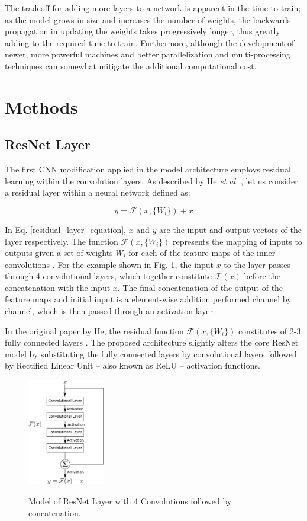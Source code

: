 \documentclass[conference]{IEEEtran}
\begin{document}
The tradeoff for adding more layers to a network is apparent in the time to train; as the model grows in size and increases the number of weights, the backwards propagation in updating the weights takes progressively longer, thus greatly adding to the required time to train. Furthermore, although the development of newer, more powerful machines and better parallelization and multi-processing techniques can somewhat mitigate the additional computational cost.
\section{Methods}
\subsection{ResNet Layer}
The first CNN modification applied in the model architecture employs residual learning within the convolution layers. As described by He \textit{et al.} \cite{He2016}, let us consider a residual layer within a neural network defined as:

\begin{equation}
y = \mathcal{F} \left(x,\{W_i\}\right) + x
\label{residual_layer_equation}
\end{equation}

In Eq. \ref{residual_layer_equation}, $x$ and $y$ are the input and output vectors of the layer respectively. The function $\mathcal{F} \left(x,\{W_i\}\right)$ represents the mapping of inputs to outputs given a set of weights $W_i$ for each of the feature maps of the inner convolutions \cite{He2016}. For the example shown in Fig. \ref{ResNet_Layer_Model}, the input $x$ to the layer passes through 4 convolutional layers, which together constitute $\mathcal{F}(x)$ before the concatenation with the input $x$. The final concatenation of the output of the feature maps and initial input is a element-wise addition performed channel by channel, which is then passed through an activation layer. 

In the original paper by He, the residual function $\mathcal{F} \left(x,\{W_i\}\right)$ constitutes of 2-3 fully connected layers \cite{He2016}. The proposed architecture slightly alters the core ResNet model by substituting the fully connected layers by convolutional layers followed by Rectified Linear Unit -- also known as ReLU -- activation functions.

\begin{figure}
\centering
\includegraphics[width=0.3\textwidth]{figures/ResNet_Model.png}
\label{ResNet_Layer_Model}
\caption{Model of ResNet Layer with 4 Convolutions followed by concatenation.}
\end{figure}
\end{document}
